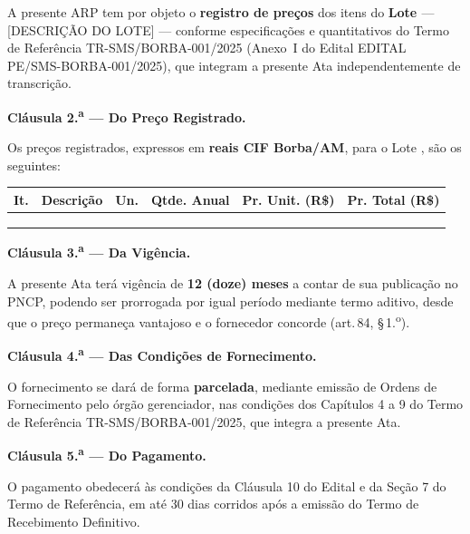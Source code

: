 \documentclass[12pt,a4paper]{article}
\newcommand{\art}[1]{art.\,#1}
\newcommand{\clausula}[1]{\vspace{6pt}\noindent\textbf{Cláusula #1.}}
\newcommand{\editalNum}{EDITAL PE/SMS-BORBA-001/2025}
\newcommand{\trRef}{TR-SMS/BORBA-001/2025}
\begin{document}
A presente ARP tem por objeto o \textbf{registro de preços} dos itens do
\textbf{Lote \underline{\hspace{0.5cm}}} --- [DESCRIÇÃO DO LOTE] ---
conforme especificações e quantitativos do Termo de Referência \trRef
(Anexo~I do Edital \editalNum), que integram a presente Ata independentemente
de transcrição.

\bigskip
\clausula{2.\textsuperscript{a} --- Do Preço Registrado}

Os preços registrados, expressos em \textbf{reais CIF Borba/AM}, para o Lote
\underline{\hspace{0.5cm}}, são os seguintes:

\begin{table}[H]\centering\small{}
\begin{tabular}{C{0.6cm} L{5.5cm} C{0.8cm} C{1.2cm} C{2.2cm} C{2.5cm}}
  \color{white}\textbf{It.} &
  \color{white}\textbf{Descrição} &
  \color{white}\textbf{Un.} &
  \color{white}\textbf{Qtde. Anual} &
  \color{white}\textbf{Pr. Unit. (R\$)} &
  \color{white}\textbf{Pr. Total (R\$)} \\
  \toprule
  & & & & & \\
  & & & & & \\
   & & \\
  \bottomrule
\end{tabular}
\end{table}

\bigskip
\clausula{3.\textsuperscript{a} --- Da Vigência}

A presente Ata terá vigência de \textbf{12 (doze) meses} a contar de sua
publicação no PNCP, podendo ser prorrogada por igual período mediante termo
aditivo, desde que o preço permaneça vantajoso e o fornecedor concorde
(\art{84}, \S\,1.\textsuperscript{o}).

\bigskip
\clausula{4.\textsuperscript{a} --- Das Condições de Fornecimento}

O fornecimento se dará de forma \textbf{parcelada}, mediante emissão de Ordens
de Fornecimento pelo órgão gerenciador, nas condições dos Capítulos 4 a 9 do
Termo de Referência \trRef, que integra a presente Ata.

\bigskip
\clausula{5.\textsuperscript{a} --- Do Pagamento}

O pagamento obedecerá às condições da Cláusula 10 do Edital e da Seção 7 do
Termo de Referência, em até 30 dias corridos após a emissão do Termo de
Recebimento Definitivo.
\end{document}
